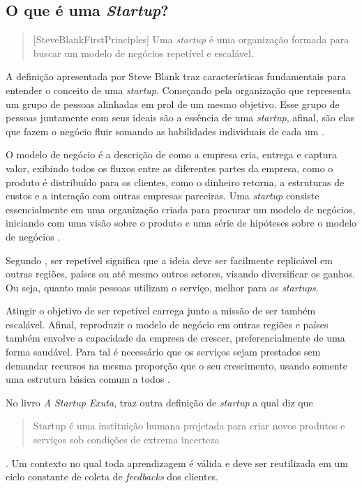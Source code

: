 \subsection[OQueEStartup]{O que é uma \textit{Startup}?}
\label{sec:OQueEUmaStartup}

\begin{quotation}[SteveBlankFirstPrinciples]
Uma \textit{startup} é uma organização formada para buscar um modelo de 
negócios repetível e escalável.
\end{quotation}

A definição apresentada por Steve Blank traz características
fundamentais para entender o conceito de uma \textit{startup}. Começando
pela organização que representa um grupo de pessoas alinhadas em prol
de um mesmo objetivo. Esse grupo de pessoas juntamente com seus ideais
são a essência de uma \textit{startup}, afinal, são elas que fazem
o negócio fluir somando as habilidades individuais de cada um
\cite{ARevolucaoDasStartups}.

O modelo de negócio é a descrição de como a empresa cria, entrega e captura
valor, exibindo todos os fluxos entre as diferentes partes da empresa,
como o produto é distribuído para os clientes, como o dinheiro retorna, a
estruturas de custos e a interação com outras empresas parceiras. Uma
\textit{startup} consiste essencialmente em uma organização criada para
procurar um modelo de negócios, iniciando com uma visão sobre o produto e
uma série de hipóteses sobre o modelo de negócios
\cite{SteveBlankFirstPrinciples}.

Segundo , ser repetível significa que 
a ideia deve ser facilmente replicável em outras regiões, países ou até
mesmo outros setores, visando diversificar os ganhos. Ou seja, quanto mais
pessoas utilizam o serviço, melhor para as \textit{startups}.

Atingir o objetivo de ser repetível carrega junto a missão de ser também
escalável. Afinal, reproduzir o modelo de negócio em outras regiões e países
também envolve a capacidade da empresa de crescer, preferencialmente de uma
forma saudável. Para tal é necessário que os serviços sejam prestados sem
demandar recursos na mesma proporção que o seu crescimento, usando somente 
uma estrutura básica comum a todos \cite{CassioSpina}.

No livro \textit{A Startup Exuta},  traz outra
definição de \textit{startup} a qual diz que \begin{quote}Startup é uma instituição
humana projetada para criar novos produtos e serviços sob condições de extrema
incerteza\end{quote}. Um contexto no qual toda aprendizagem é válida e deve ser
reutilizada em um ciclo constante de coleta de \textit{feedbacks} dos clientes.

